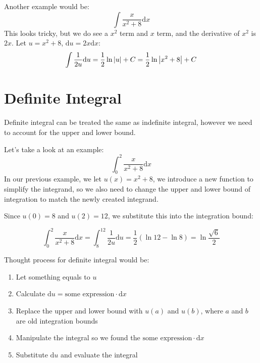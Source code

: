 \documentclass{article}
\numberwithin{equation}{section}
\begin{document}
Another example would be:
\[
\int \frac{x}{x^2+8}\mathrm{d}x
\]
This looks tricky, but we do see a $x^2$ term and $x$ term, and the derivative of $x^2$ is $2x$.
Let $u = x^2+8$, $\mathrm{d}u = 2x \mathrm{d}x$:
\[
\int \frac{1}{2u} \mathrm{d}u = \frac{1}{2} \ln{\abs{u}} + C = \frac{1}{2} \ln{\abs{x^2+8}} + C
\]

\section{Definite Integral}
Definite integral can be treated the same as indefinite integral, however we need to account for the upper and lower bound.

Let's take a look at an example:
\[
\int_{0}^{2} \frac{x}{x^2+8}\mathrm{d}x
\]
In our previous example, we let $u(x) = x^2+8$, we introduce a new function to simplify the integrand,
so we also need to change the upper and lower bound of integration to match the newly created integrand.

Since $u(0) = 8$ and $u(2) = 12$, we substitute this into the integration bound:

\[
\int_{0}^{2} \frac{x}{x^2+8}\mathrm{d}x = \int_{8}^{12} \frac{1}{2u}\mathrm{d}u = \frac{1}{2} (\ln{12}-\ln{8}) = \ln{\frac{\sqrt{6}}{2}}
\]

Thought process for definite integral would be:
\begin{enumerate}
    \item Let something equals to $u$
    \item Calculate $\mathrm{d}u = \text{some expression} \cdot \mathrm{d}x$
    \item Replace the upper and lower bound with $u(a)$ and $u(b)$, where $a$ and $b$ are old integration bounds
    \item Manipulate the integral so we found the $\text{some expression} \cdot \mathrm{d}x$
    \item Substitute $\mathrm{d}u$ and evaluate the integral
\end{enumerate}
\end{document}
